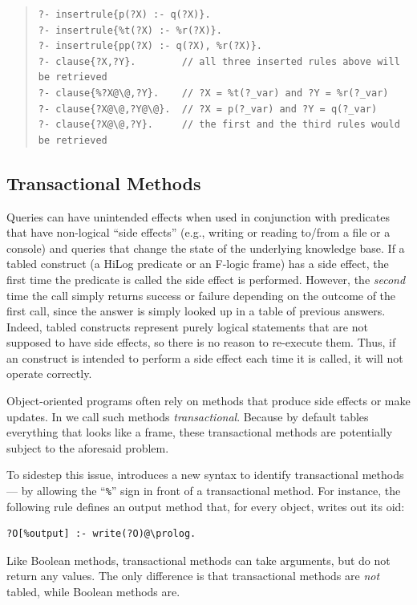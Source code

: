 \documentclass[11pt]{article}
\newcommand{\ERGO}{\mbox{\smaller{\ensuremath{\cal{E}}\smaller{{\sc{RGO}}}}}\xspace}
\newcommand{\FLSYSTEM}{\ERGO}
\begin{document}
\begin{quote}
\begin{verbatim}
?- insertrule{p(?X) :- q(?X)}.  
?- insertrule{%t(?X) :- %r(?X)}.
?- insertrule{pp(?X) :- q(?X), %r(?X)}.
?- clause{?X,?Y}.        // all three inserted rules above will be retrieved
?- clause{%?X@\@,?Y}.    // ?X = %t(?_var) and ?Y = %r(?_var)
?- clause{?X@\@,?Y@\@}.  // ?X = p(?_var) and ?Y = q(?_var)
?- clause{?X@\@,?Y}.     // the first and the third rules would be retrieved
\end{verbatim}
\end{quote}

\subsection{Transactional Methods}\label{sec-proc-methods}

%
Queries can
have unintended effects when used in conjunction with
predicates that have non-logical ``side effects''
(e.g., writing or reading to/from a file or a console) and queries that change the state of
the underlying knowledge base.  If a tabled construct (a HiLog predicate
or an F-logic frame)
has a side effect, the first time the
predicate is called the side effect is performed. However, the \emph{second} time the
call simply returns success or failure depending on the outcome of
the first call, since the answer is simply looked
up in a table of previous answers. Indeed, tabled constructs represent
purely logical statements that are not supposed to have side effects, so
there is no reason to re-execute them.
Thus, if an \FLSYSTEM construct
is intended to perform a side effect each time it is
called, it will not operate correctly.

Object-oriented programs often rely on methods that produce side effects
or make updates.  In \FLSYSTEM we call such methods 
\emph{transactional}.
Because by default \FLSYSTEM tables everything that looks like a frame,
these transactional methods are potentially subject to the aforesaid problem.

To sidestep this issue, \FLSYSTEM introduces a new syntax to identify
transactional methods --- by allowing the ``\verb|%|'' sign in front of a
transactional method. For instance, the following rule defines an output
method that, for every object, writes out its oid:
\begin{verbatim}
?O[%output] :- write(?O)@\prolog.
\end{verbatim}
Like Boolean methods, transactional methods can take arguments, but do not
return any values.  The only difference is that transactional methods are
\emph{not} tabled, while Boolean methods are.
\end{document}
